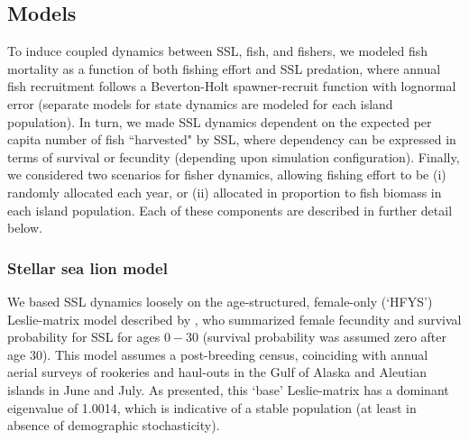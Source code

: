 \documentclass[nonumbib,leqno]{nrc1}
\begin{document}
\subsection{Models}


To induce coupled dynamics between SSL, fish, and fishers, we modeled
fish mortality as a function of both fishing effort and SSL predation, where annual fish recruitment follows a Beverton-Holt spawner-recruit function \citep{BevertonHolt1957} with lognormal error (separate models for state dynamics are modeled for each island population).  In turn, we made SSL dynamics dependent on the expected per capita number of fish ``harvested" by SSL, where dependency can be expressed in terms of survival or fecundity (depending upon simulation configuration).  Finally, we considered two scenarios for fisher dynamics, allowing fishing effort to be (i) randomly allocated each year, or (ii) allocated in proportion to fish biomass in each island population.  Each of these components are described in further detail below.


\subsubsection{Stellar sea lion model}

We based SSL dynamics loosely on the age-structured, female-only (`HFYS') Leslie-matrix model described by \citet{HolmesEtAl2007}, who summarized female fecundity and survival probability for SSL for ages $0-30$ (survival probability was assumed zero after age 30).  This model assumes a post-breeding census, coinciding with annual aerial surveys of rookeries and haul-outs in the Gulf of Alaska and Aleutian islands in June and July.  As presented, this `base' Leslie-matrix has a dominant eigenvalue of 1.0014, which is indicative of a stable population (at least in absence of demographic stochasticity).
\end{document}
